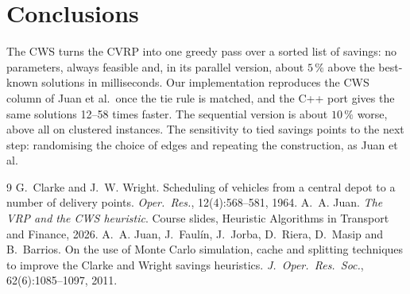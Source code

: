 \documentclass[10pt,a4paper]{article}
\begin{document}
\section{Conclusions}

The CWS turns the CVRP into one greedy pass over a sorted list of savings: no parameters, always
feasible and, in its parallel version, about $5\,\%$ above the best-known solutions in milliseconds. Our
implementation reproduces the CWS column of Juan et al.\ once the tie rule is matched, and the C++ port
gives the same solutions 12--58 times faster. The sequential version is about $10\,\%$ worse, above all
on clustered instances. The sensitivity to tied savings points to the next step: randomising the choice
of edges and repeating the construction, as Juan et al.

\begin{thebibliography}{9}
\footnotesize\setlength{\itemsep}{0pt}\setlength{\parskip}{0pt}
 G.~Clarke and J.~W. Wright. Scheduling of vehicles from a central depot to a number of
delivery points. \emph{Oper.\ Res.}, 12(4):568--581, 1964.
 A.~A. Juan. \emph{The VRP and the CWS heuristic}. Course slides, Heuristic Algorithms in
Transport and Finance, 2026.
 A.~A. Juan, J.~Faulín, J.~Jorba, D.~Riera, D.~Masip and B.~Barrios. On the use of Monte
Carlo simulation, cache and splitting techniques to improve the Clarke and Wright savings heuristics.
\emph{J.\ Oper.\ Res.\ Soc.}, 62(6):1085--1097, 2011.
\end{thebibliography}
\end{document}
